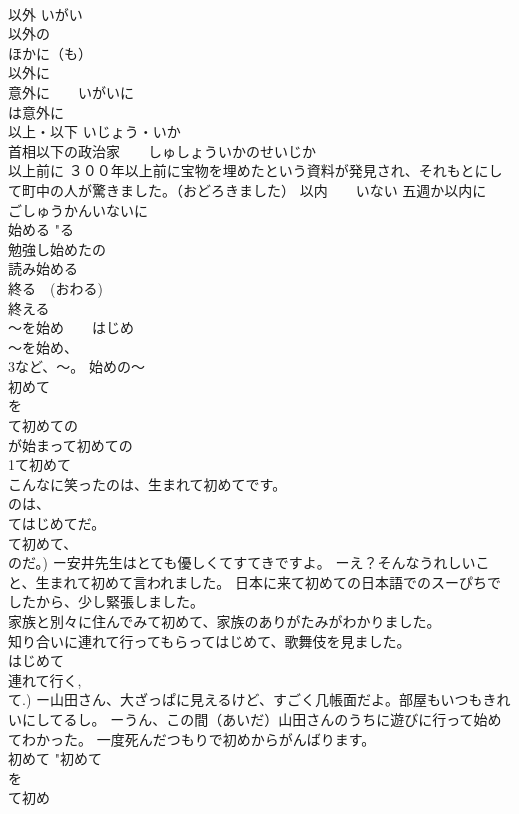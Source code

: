 \documentclass[8pt]{extreport}
\begin{document}
\begin{CJK}{UTF8}{min}
\\	以外	いがい 
\\	以外の
\\	ほかに（も） 
\\	以外に
\\	意外に　　いがいに 
\\	は意外に
\\	以上・以下 いじょう・いか 
\\	首相以下の政治家　　しゅしょういかのせいじか 
\\	以上前に ３００年以上前に宝物を埋めたという資料が発見され、それもとにして町中の人が驚きました。（おどろきました） 以内　　いない 五週か以内に　　ごしゅうかんいないに 
\\	始める	"る
\\	勉強し始めたの 
\\	読み始める　
\\	終る　(おわる) 
\\	終える 
\\	～を始め　　はじめ 
\\	～を始め、
\\	3など、～。 始めの～ 
\\	初めて
\\	を
\\	て初めての
\\	が始まって初めての
\\	1て初めて
\\	こんなに笑ったのは、生まれて初めてです。 
\\	のは、
\\	てはじめてだ。 
\\	て初めて、
\\	のだ。) ー安井先生はとても優しくてすてきですよ。 ーえ？そんなうれしいこと、生まれて初めて言われました。 日本に来て初めての日本語でのスーぴちでしたから、少し緊張しました。 
\\	家族と別々に住んでみて初めて、家族のありがたみがわかりました。 
\\	知り合いに連れて行ってもらってはじめて、歌舞伎を見ました。 
\\	はじめて 
\\	連れて行く, 
\\	て.) ー山田さん、大ざっぱに見えるけど、すごく几帳面だよ。部屋もいつもきれいにしてるし。 ーうん、この間（あいだ）山田さんのうちに遊びに行って始めてわかった。 一度死んだつもりで初めからがんばります。 
\\	初めて	"初めて
\\	を
\\	て初め 

\end{CJK}
\end{document}
